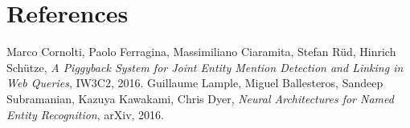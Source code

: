 \documentclass{article}
\begin{document}
\section{References}
\renewcommand{\section}[2]{}%
\begin{thebibliography}{9}
  Marco Cornolti, Paolo Ferragina, Massimiliano Ciaramita, Stefan Rüd, Hinrich Schütze,
  \emph{A Piggyback System for Joint Entity Mention Detection
and Linking in Web Queries},
  IW3C2,
  2016.
Guillaume Lample, Miguel Ballesteros, Sandeep Subramanian, Kazuya Kawakami, Chris Dyer,
  \emph{Neural Architectures for Named Entity Recognition},
  arXiv,
  2016.

\end{thebibliography}
\end{document}
